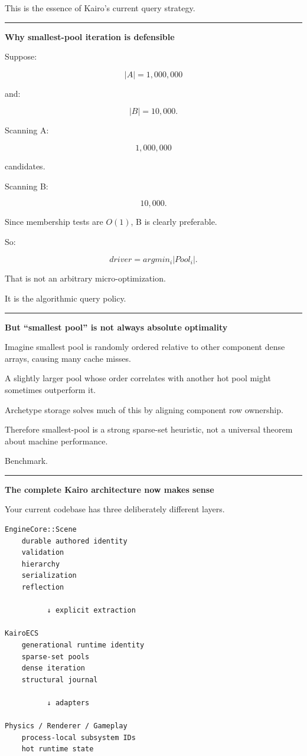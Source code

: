 This is the essence of Kairo's current query strategy.

\begin{center}\rule{0.5\linewidth}{0.5pt}\end{center}

\textbf{Why smallest-pool iteration is defensible}

Suppose:

\[
|A|=1,000,000
\]

and:

\[
|B|=10,000.
\]

Scanning A:

\[
1,000,000
\]

candidates.

Scanning B:

\[
10,000.
\]

Since membership tests are \(O(1)\), B is clearly preferable.

So:

\[
\boxed{
driver=
argmin_i |Pool_i|.
}
\]

That is not an arbitrary micro-optimization.

It is the algorithmic query policy.

\begin{center}\rule{0.5\linewidth}{0.5pt}\end{center}

\textbf{But ``smallest pool'' is not always absolute optimality}

Imagine smallest pool is randomly ordered relative to other component dense arrays, causing many cache misses.

A slightly larger pool whose order correlates with another hot pool might sometimes outperform it.

Archetype storage solves much of this by aligning component row ownership.

Therefore smallest-pool is a strong sparse-set heuristic, not a universal theorem about machine performance.

Benchmark.

\begin{center}\rule{0.5\linewidth}{0.5pt}\end{center}

\textbf{The complete Kairo architecture now makes sense}

Your current codebase has three deliberately different layers.

\begin{verbatim}
EngineCore::Scene
    durable authored identity
    validation
    hierarchy
    serialization
    reflection

          ↓ explicit extraction

KairoECS
    generational runtime identity
    sparse-set pools
    dense iteration
    structural journal

          ↓ adapters

Physics / Renderer / Gameplay
    process-local subsystem IDs
    hot runtime state
\end{verbatim}

